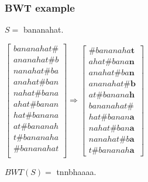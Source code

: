 \documentclass{beamer}
\begin{document}
\begin{frame}
\frametitle{BWT example}
$S = $ bananahat.
\begin{center}
$\begin{bmatrix}
	bananahat\#\\
	ananahat\#b\\
	nanahat\#ba\\
	anahat\#ban\\
	nahat\#bana\\
	ahat\#banan\\
	hat\#banana\\
	at\#bananah\\
	t\#bananaha\\
	\#bananahat\\
\end{bmatrix} \boldsymbol\Rightarrow
\begin{bmatrix}
	\#bananaha\textbf{t}\\
	ahat\#bana\textbf{n}\\
	anahat\#ba\textbf{n}\\
	ananahat\#\textbf{b}\\
	at\#banana\textbf{h}\\
	bananahat\#\\
	hat\#banan\textbf{a}\\
	nahat\#ban\textbf{a}\\
	nanahat\#b\textbf{a}\\
	t\#bananah\textbf{a}
\end{bmatrix}$
\end{center}
$BWT(S) = $ tnnbhaaaa.
\end{frame}
\end{document}
